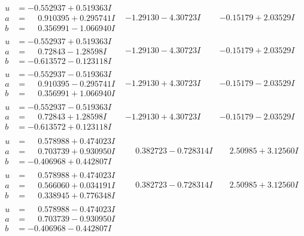 \documentclass[1p]{elsarticle_modified}
\theoremstyle{definition}
\begin{document}
$$\begin{array}{c|c|c}
\begin{aligned}
u &= -0.552937 + 0.519363 I \\
a &= \phantom{-}0.910395 + 0.295741 I \\
b &= \phantom{-}0.356991 - 1.066940 I\end{aligned}
 & -1.29130 - 4.30723 I & -0.15179 + 2.03529 I \\ \hline\begin{aligned}
u &= -0.552937 + 0.519363 I \\
a &= \phantom{-}0.72843 - 1.28598 I \\
b &= -0.613572 - 0.123118 I\end{aligned}
 & -1.29130 - 4.30723 I & -0.15179 + 2.03529 I \\ \hline\begin{aligned}
u &= -0.552937 - 0.519363 I \\
a &= \phantom{-}0.910395 - 0.295741 I \\
b &= \phantom{-}0.356991 + 1.066940 I\end{aligned}
 & -1.29130 + 4.30723 I & -0.15179 - 2.03529 I \\ \hline\begin{aligned}
u &= -0.552937 - 0.519363 I \\
a &= \phantom{-}0.72843 + 1.28598 I \\
b &= -0.613572 + 0.123118 I\end{aligned}
 & -1.29130 + 4.30723 I & -0.15179 - 2.03529 I \\ \hline\begin{aligned}
u &= \phantom{-}0.578988 + 0.474023 I \\
a &= \phantom{-}0.703739 + 0.930950 I \\
b &= -0.406968 + 0.442807 I\end{aligned}
 & \phantom{-}0.382723 - 0.728314 I & \phantom{-}2.50985 + 3.12560 I \\ \hline\begin{aligned}
u &= \phantom{-}0.578988 + 0.474023 I \\
a &= \phantom{-}0.566060 + 0.034191 I \\
b &= \phantom{-}0.338945 + 0.776348 I\end{aligned}
 & \phantom{-}0.382723 - 0.728314 I & \phantom{-}2.50985 + 3.12560 I \\ \hline\begin{aligned}
u &= \phantom{-}0.578988 - 0.474023 I \\
a &= \phantom{-}0.703739 - 0.930950 I \\
b &= -0.406968 - 0.442807 I\end{aligned}

\end{array}$$
\end{document}
